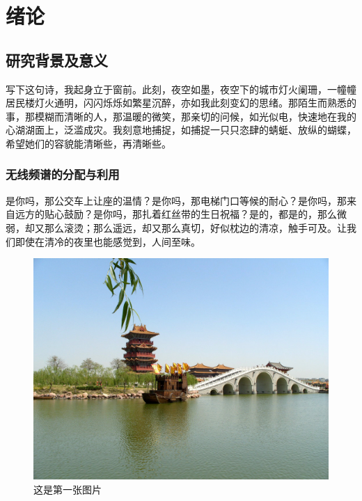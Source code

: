 
\chapter{绪论}
\section{研究背景及意义}
写下这句诗，我起身立于窗前。此刻，夜空如墨，夜空下的城市灯火阑珊，一幢幢居民楼灯火通明，闪闪烁烁如繁星沉醉，亦如我此刻变幻的思绪。那陌生而熟悉的事，那模糊而清晰的人，那温暖的微笑，那亲切的问候，如光似电，快速地在我的心湖湖面上，泛滥成灾。我刻意地捕捉，如捕捉一只只恣肆的蜻蜓、放纵的蝴蝶，希望她们的容貌能清晰些，再清晰些。
\subsection{无线频谱的分配与利用}
是你吗，那公交车上让座的温情？是你吗，那电梯门口等候的耐心？是你吗，那来自远方的贴心鼓励？是你吗，那扎着红丝带的生日祝福？是的，都是的，那么微弱，却又那么滚烫；那么遥远，却又那么真切，好似枕边的清凉，触手可及。让我们即使在清冷的夜里也能感觉到，人间至味。
\begin{figure}
    \centering
    \caption{这是第一张图片}
    \includegraphics[scale=0.4]{figures/timg.jpg}
\end{figure}

